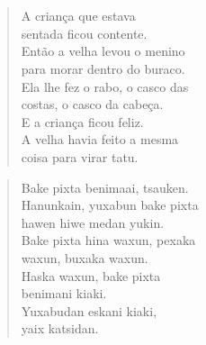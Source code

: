 \chapter*{}

\mbox{}\vspace*{\fill}

\begin{verse}
A criança que estava\\
sentada ficou contente.\\
Então a velha levou o menino\\
para morar dentro do buraco.\\
Ela lhe fez o rabo, o casco das\\
costas, o casco da cabeça.\\
E a criança ficou feliz.\\
A velha havia feito a mesma\\
coisa para virar tatu.
\end{verse}

\begin{verse}
Bake pixta benimaai, tsauken.\\
Hanunkain, yuxabun bake pixta\\
hawen hiwe medan yukin.\\
Bake pixta hina waxun, pexaka\\
waxun, buxaka waxun.\\
Haska waxun, bake pixta\\
benimani kiaki.\\
Yuxabudan eskani kiaki,\\
yaix katsidan.
\end{verse}

\vspace*{\fill}

